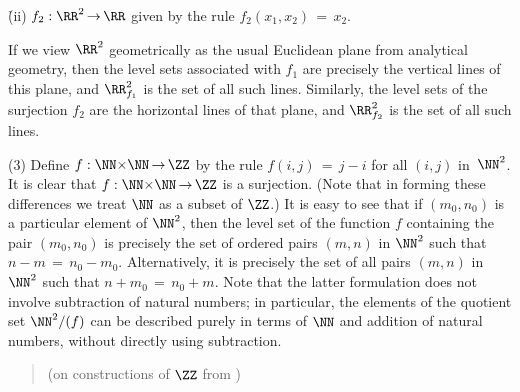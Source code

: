 {        \h (ii) $f_{2}:{\RR}^{2} \,{\rightarrow}\, {\RR}$ given by the rule $f_{2}(x_{1},x_{2}) \,=\, x_{2}$.

\VA

\noindent If we view ${\RR}^{2}$ geometrically as the usual Euclidean plane from analytical geometry,
    then the level sets associated with $f_{1}$ are precisely the vertical lines of this plane, and ${\RR}^{2}_{f_{1}}$ is the set of all such lines.
    Similarly, the level sets of the surjection $f_{2}$ are the horizontal lines of that plane, and ${\RR}^{2}_{f_{2}}$ is the set of all such lines.

\V

        (3) Define $f:{\NN}{\times}{\NN} \,{\rightarrow}\, {\ZZ}$ by the rule $f(i,j) \,=\, j-i$ for all $(i,j)$ in~${\NN}^{2}$.
    It is clear that $f:{\NN}{\times}{\NN} \,{\rightarrow}\, {\ZZ}$ is a surjection.
    (Note that in forming these differences we treat ${\NN}$ as a subset of ${\ZZ}$.)
    It is easy to see that if $(m_{0},n_{0})$ is a particular element of ${\NN}^{2}$,
    then the level set of the function $f$ containing the pair $(m_{0},n_{0})$ is precisely
    the set of ordered pairs $(m,n)$ in ${\NN}^{2}$ such that $n-m \,=\, n_{0}-m_{0}$. Alternatively,
    it is precisely the set of all pairs $(m,n)$ in ${\NN}^{2}$ such that $n+m_{0} \,=\, n_{0} + m$.
    Note that the latter formulation does not involve subtraction of natural numbers;
    in particular, the elements of the quotient set ${\NN}^{2}/(f)$ can be described purely in terms of ${\NN}$ and addition of natural numbers,
    without directly using subtraction.
    

\VV


\begin{quotation}
{\footnotesize \underline{\Note} (on constructions of ${\ZZ}$ from {\NN})

}
\end{quotation}}
